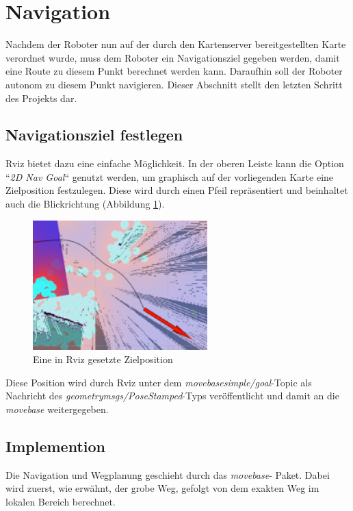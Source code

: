 \section{Navigation}
{	
		Nachdem der Roboter nun auf der durch den Kartenserver bereitgestellten Karte verordnet wurde, muss dem Roboter ein Navigationsziel gegeben werden, damit eine Route zu diesem Punkt berechnet werden kann. Daraufhin soll der Roboter autonom zu diesem Punkt navigieren. Dieser Abschnitt stellt den letzten Schritt des Projekts dar.
		
		\subsection{Navigationsziel festlegen}
		{
			Rviz bietet dazu eine einfache Möglichkeit. In der oberen Leiste kann die Option ``\emph{2D Nav Goal}`` genutzt werden, um graphisch auf der vorliegenden Karte eine Zielposition festzulegen. Diese wird durch einen Pfeil repräsentiert und beinhaltet auch die Blickrichtung (Abbildung \ref{pic:rviznavgoalsmall}).
			\begin{figure}[b]
				\centering
				\includegraphics[height=5cm]{Bilder/rviz_navgoal_small.png}
				\caption{Eine in Rviz gesetzte Zielposition} 
				\label{pic:rviznavgoalsmall}
			\end{figure}
		Diese Position wird durch Rviz unter dem \emph{move\textunderscore base\textunderscore simple/goal}-Topic als Nachricht des  \emph{geometry\textunderscore msgs/PoseStamped}-Typs veröffentlicht und damit an die \emph{move\textunderscore base} weitergegeben.
		}
	
		\subsection{Implemention}
		{
			Die Navigation und Wegplanung geschieht durch das \emph{move\tus base}- Paket. Dabei wird zuerst, wie erwähnt, der grobe Weg, gefolgt von dem exakten Weg im lokalen Bereich berechnet.
		}
}	